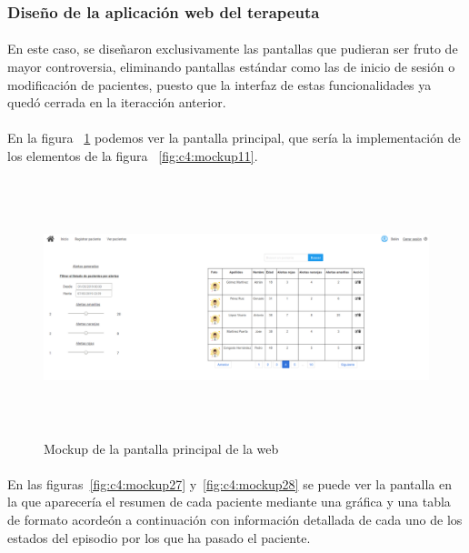 \subsubsection{Diseño de la aplicación web del terapeuta}
\paragraph{}
En este caso, se diseñaron exclusivamente las pantallas que pudieran ser fruto de mayor controversia, eliminando pantallas estándar como las de inicio de sesión o modificación de pacientes, puesto que la interfaz de estas funcionalidades ya quedó cerrada en la iteracción anterior.

\paragraph{}
En la figura ~\ref{fig:c4:mockup26} podemos ver la pantalla principal, que sería la implementación de los elementos de la figura ~\ref{fig:c4:mockup11}.

\begin{figure}[h]
    \centering
    \includegraphics[height=7.5cm, width=\textwidth]{Imagenes/anxA17.png}
    \caption[Mockup de la pantalla principal de la web]{Mockup de la pantalla principal de la web}
    \label{fig:c4:mockup26}
\end{figure}

\paragraph{}
En las figuras~\ref{fig:c4:mockup27} y~\ref{fig:c4:mockup28} se puede ver la pantalla en la que aparecería el resumen de cada paciente mediante una gráfica y una tabla de formato acordeón a continuación con información detallada de cada uno de los estados del episodio por los que ha pasado el paciente.

